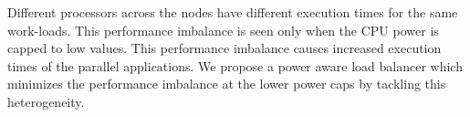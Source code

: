 Different processors across the nodes have different execution times for the
same work-loads. This performance imbalance is seen only when the CPU power is
capped to low values. This performance imbalance causes increased execution
times of the parallel applications.  We propose a power aware load balancer which
minimizes the performance imbalance at the lower power caps by tackling this
heterogeneity.
